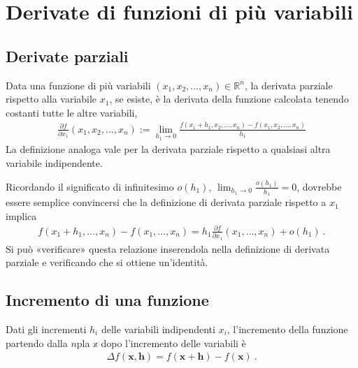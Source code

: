 \documentclass[letterpaper,10pt,italian]{jupyterBook}
\begin{document}
\section{Derivate di funzioni di più variabili}
\label{\detokenize{ch/multivariable-calculus/derivatives:derivate-di-funzioni-di-piu-variabili}}\label{\detokenize{ch/multivariable-calculus/derivatives:multivariable-calculus-derivatives}}\label{\detokenize{ch/multivariable-calculus/derivatives::doc}}

\subsection{Derivate parziali}
\label{\detokenize{ch/multivariable-calculus/derivatives:derivate-parziali}}
\sphinxAtStartPar
Data una funzione di più variabili \((x_1, x_2, \dots, x_n) \in \mathbb{R}^n\), la derivata parziale rispetto alla variabile \(x_1\), se esiste, è la derivata della funzione calcolata tenendo costanti tutte le altre variabili,
\begin{equation*}
\begin{split}\frac{\partial f}{\partial x_1}(x_1, x_2, \dots, x_n) := \lim_{h_1 \rightarrow 0} \frac{f(x_1+h_1, x_2, \dots, x_n) - f(x_1, x_2, \dots, x_n)}{h_1}\end{split}
\end{equation*}
\sphinxAtStartPar
La definizione analoga vale per la derivata parziale rispetto a qualsiasi altra variabile indipendente.

\sphinxAtStartPar
Ricordando il significato di infinitesimo \(o(h_1)\), \(\lim_{h_1 \rightarrow 0} \frac{o(h_1)}{h_1} = 0\), dovrebbe essere semplice convincersi che la definizione di derivata parziale rispetto a \(x_1\) implica
\begin{equation}\label{equation:ch/multivariable-calculus/derivatives:multivariable-calculus:derivatives:partial:differential}
\begin{split}
  f(x_1+h_1, \dots, x_n) - f(x_1, \dots, x_n) = h_1 \frac{\partial f}{\partial x_1}(x_1, \dots, x_n) + o(h_1) \ .
\end{split}
\end{equation}
\sphinxAtStartPar
Si può «verificare» questa relazione inserendola nella definizione di derivata parziale e verificando che si ottiene un’identità.


\subsection{Incremento di una funzione}
\label{\detokenize{ch/multivariable-calculus/derivatives:incremento-di-una-funzione}}
\sphinxAtStartPar
Dati gli incrementi \(h_i\) delle variabili indipendenti \(x_i\), l’incremento della funzione partendo dalla \(n\)\sphinxhyphen{}pla \(\mathbb{x}\) dopo l’incremento delle variabili è
\begin{equation*}
\begin{split}\Delta f(\mathbf{x}, \mathbf{h}) = f(\mathbf{x} + \mathbf{h}) - f(\mathbf{x}) \ .\end{split}
\end{equation*}
\end{document}
